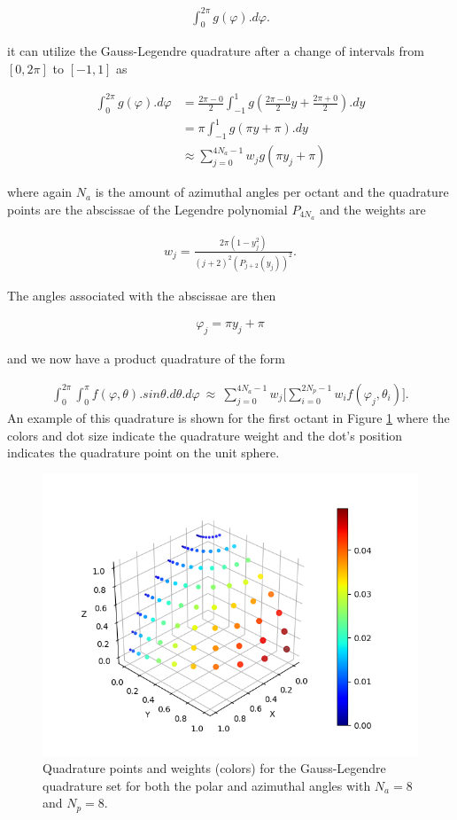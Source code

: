 \documentclass[11pt,letterpaper,titlepage]{article}
\newcommand{\beq}{\begin{equation*}
\begin{aligned}}
\newcommand{\eeq}{\end{aligned}
\end{equation*}}
\newcommand{\beqn}{\begin{equation}
	\begin{aligned}}
\newcommand{\eeqn}{\end{aligned}
	\end{equation}}
\numberwithin{equation}{section}
\begin{document}
\begin{appendices}
\beq
\int_0^{2\pi} g(\varphi).d\varphi.
\eeq

it can utilize the Gauss-Legendre quadrature after a change of intervals from $[0,2\pi]$ to $[-1,1]$ as

\beq
\int_0^{2\pi} g(\varphi).d\varphi 
&= \frac{2\pi-0}{2}\int_{-1}^1 g(\frac{2\pi-0}{2} y + \frac{2\pi+0}{2}).dy \\
&= \pi \int_{-1}^1 g(\pi y + \pi).dy \\
&\approx  \sum_{j=0}^{4N_a-1} w_j g(\pi y_j+\pi)
\eeq

where again $N_a$ is the amount of azimuthal angles per octant and the quadrature points are the abscissae of the Legendre polynomial $P_{4N_a}$ and the weights are 

\beqn
w_j = \frac{2\pi(1-y_j^2)}{(j+2)^2  (P_{j+2}(y_j))^2}.
\eeqn

The angles associated with the abscissae are then 

\beqn
\varphi_j =\pi y_j + \pi
\eeqn

and we now have a product quadrature of the form

\beqn
\int_0^{2\pi}\int_0^\pi f(\varphi,\theta).sin\theta.d\theta.d\varphi\ 
\approx \  \sum_{j=0}^{4N_a-1} w_j \biggr[
\sum_{i=0} ^{2N_p-1}   w_i f(\varphi_j,\theta_i)
\biggr].
\eeqn
\newline
An example of this quadrature is shown for the first octant in Figure \ref{fig:s8gausslegendrelegendre} where the colors and dot size indicate the quadrature weight and the dot's position indicates the quadrature point on the unit sphere.
\begin{figure}[h]
\centering
\includegraphics[width=0.7\linewidth]{Figures/Gauss-Legendre-Legendre.png}
\caption{Quadrature points and weights (colors) for the Gauss-Legendre quadrature set for both the polar and azimuthal angles with $N_a=8$ and $N_p=8$.}
\label{fig:s8gausslegendrelegendre}
\end{figure}


\end{appendices}
\end{document}
